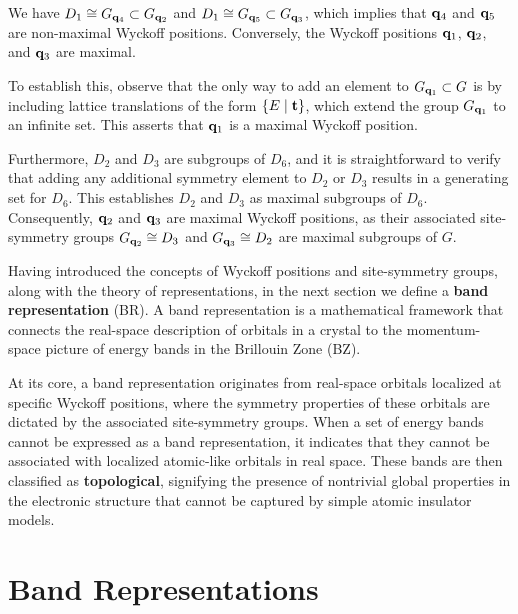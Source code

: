 \begin{example} \label{ex:maximal_wyckpos_example}
We have \( D_1 \cong G_{{\vb{q}}_4} \subset G_{{\vb{q}}_2} \) and \( D_1 \cong G_{{\vb{q}}_5} \subset G_{{\vb{q}}_3} \), which implies that \({\vb{q}}_4\) and \({\vb{q}}_5\) are non-maximal Wyckoff positions. Conversely, the Wyckoff positions \({\vb{q}}_1\), \({\vb{q}}_2\), and \({\vb{q}}_3\) are maximal.

To establish this, observe that the only way to add an element to \( G_{{\vb{q}}_1} \subset G \) is by including lattice translations of the form \(\{E \mid {\vb{t}}\}\), which extend the group \(G_{{\vb{q}}_1}\) to an infinite set. This asserts that \({\vb{q}}_1\) is a maximal Wyckoff position.

Furthermore, \( D_2 \) and \( D_3 \) are subgroups of \( D_6 \), and it is straightforward to verify that adding any additional symmetry element to \( D_2 \) or \( D_3 \) results in a generating set for \( D_6 \). This establishes \( D_2 \) and \( D_3 \) as maximal subgroups of \( D_6 \). Consequently, \({\vb{q}}_2\) and \({\vb{q}}_3\) are maximal Wyckoff positions, as their associated site-symmetry groups \( G_{{\vb{q}}_2} \cong D_3 \) and \( G_{{\vb{q}}_3} \cong D_2 \) are maximal subgroups of \( G \).
\end{example}

Having introduced the concepts of Wyckoff positions and site-symmetry groups, along with the theory of representations, in the next section we define a \textbf{band representation} (BR). A band representation is a mathematical framework that connects the real-space description of orbitals in a crystal to the momentum-space picture of energy bands in the Brillouin Zone (BZ).

At its core, a band representation originates from real-space orbitals localized at specific Wyckoff positions, where the symmetry properties of these orbitals are dictated by the associated site-symmetry groups. When a set of energy bands cannot be expressed as a band representation, it indicates that they cannot be associated with localized atomic-like orbitals in real space. These bands are then classified as \textbf{topological}, signifying the presence of nontrivial global properties in the electronic structure that cannot be captured by simple atomic insulator models.

\section{Band Representations}


